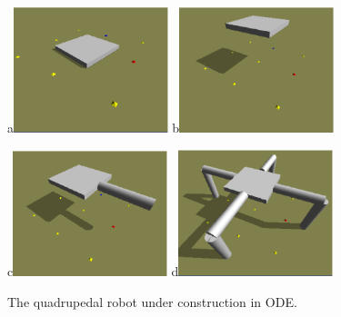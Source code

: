 \documentclass[12pt]{article}
\begin{document}
\begin{figure}[!t]
\centerline{
a\includegraphics[width=0.4\textwidth]{Fig2a.eps}
b\includegraphics[width=0.4\textwidth]{Fig2b.eps}
}
\centerline{
c\includegraphics[width=0.4\textwidth]{Fig2c.eps}
d\includegraphics[width=0.4\textwidth]{Fig2d.eps}
}
\caption{The quadrupedal robot under construction in ODE.}
\label{Fig2}
\end{figure}
\end{document}
